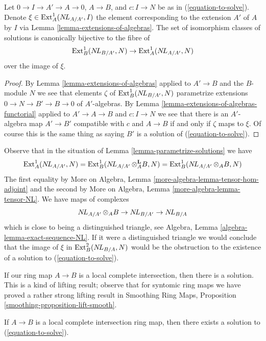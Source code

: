 \begin{lemma}
\label{lemma-parametrize-solutions}
Let $0 \to I \to A' \to A \to 0$, $A \to B$, and $c : I \to N$ be as in
(\ref{equation-to-solve}). Denote $\xi \in \mathop{\mathrm{Ext}}\nolimits^1_A(\mathop{N\!L}\nolimits_{A/A'}, I)$
the element corresponding to the extension $A'$ of $A$ by $I$ via
Lemma \ref{lemma-extensions-of-algebras}. The set of isomorphism
classes of solutions is canonically bijective to the fibre of
$$
\mathop{\mathrm{Ext}}\nolimits^1_B(\mathop{N\!L}\nolimits_{B/A'}, N) \to \mathop{\mathrm{Ext}}\nolimits^1_A(\mathop{N\!L}\nolimits_{A/A'}, N)
$$
over the image of $\xi$.
\end{lemma}

\begin{proof}
By Lemma \ref{lemma-extensions-of-algebras} applied to $A' \to B$ and
the $B$-module $N$ we see that elements $\zeta$ of $\mathop{\mathrm{Ext}}\nolimits^1_B(\mathop{N\!L}\nolimits_{B/A'}, N)$
parametrize extensions $0 \to N \to B' \to B \to 0$ of $A'$-algebras.
By Lemma \ref{lemma-extensions-of-algebras-functorial} applied
to $A' \to A \to B$ and $c : I \to N$ we see that there is an $A'$-algebra
map $A' \to B'$ compatible with $c$ and $A \to B$ if and only if
$\zeta$ maps to $\xi$. Of course this is the same thing as saying $B'$ is a
solution of (\ref{equation-to-solve}).
\end{proof}

\begin{remark}
\label{remark-parametrize-solutions}
Observe that in the situation of Lemma \ref{lemma-parametrize-solutions}
we have
$$
\mathop{\mathrm{Ext}}\nolimits^1_A(\mathop{N\!L}\nolimits_{A/A'}, N) =
\mathop{\mathrm{Ext}}\nolimits^1_B(\mathop{N\!L}\nolimits_{A/A'} \otimes_A^\mathbf{L} B, N) =
\mathop{\mathrm{Ext}}\nolimits^1_B(\mathop{N\!L}\nolimits_{A/A'} \otimes_A B, N)
$$
The first equality by
More on Algebra, Lemma \ref{more-algebra-lemma-tensor-hom-adjoint} and
the second by
More on Algebra, Lemma \ref{more-algebra-lemma-tensor-NL}.
We have maps of complexes
$$
\mathop{N\!L}\nolimits_{A/A'} \otimes_A B \to \mathop{N\!L}\nolimits_{B/A'} \to \mathop{N\!L}\nolimits_{B/A}
$$
which is close to being a distinguished triangle, see
Algebra, Lemma \ref{algebra-lemma-exact-sequence-NL}.
If it were a distinguished triangle we would conclude
that the image of $\xi$ in $\mathop{\mathrm{Ext}}\nolimits^2_B(\mathop{N\!L}\nolimits_{B/A}, N)$
would be the obstruction to the existence of a solution to
(\ref{equation-to-solve}).
\end{remark}

\noindent
If our ring map $A \to B$ is a local complete intersection, then there
is a solution. This is a kind of lifting result; observe that
for syntomic ring maps we have proved a rather strong lifting result in
Smoothing Ring Maps, Proposition \ref{smoothing-proposition-lift-smooth}.

\begin{lemma}
\label{lemma-existence-lci}
If $A \to B$ is a local complete intersection ring map, then
there exists a solution to (\ref{equation-to-solve}).
\end{lemma}

